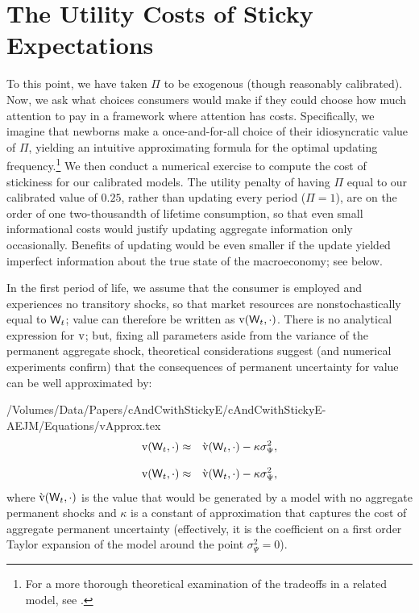 \documentclass[titlepage]{./econtex}
\begin{document}
 
\hypertarget{Utility-Costs-Of-Sticky-Expectations}{}
\section{The Utility Costs of Sticky Expectations}\label{sec:uCost}

To this point, we have taken $\Pi$ to be exogenous (though reasonably calibrated).  Now, we ask what choices consumers would make if they could choose how much attention to pay in a framework where attention has costs.  Specifically, we imagine that newborns make a once-and-for-all choice of their idiosyncratic value of $\Pi$, yielding an intuitive approximating formula for the optimal updating frequency.\footnote{For a more thorough theoretical examination of the tradeoffs in a related model, see \cite{reis:inattentive}.}  We then conduct a numerical exercise to compute the cost of stickiness for our calibrated models.  The utility penalty of having $\Pi$ equal to our calibrated value of $0.25$, rather than updating every period ($\Pi=1$), are on the order of one two-thousandth of lifetime consumption, so that even small informational costs would justify updating aggregate information only occasionally.  Benefits of updating would be even smaller if the update yielded imperfect information about the true state of the macroeconomy; see below.

In the first period of life, we assume that the consumer is employed and experiences no transitory shocks, so that market resources are nonstochastically equal to $\mathsf{W}_t$; value can therefore be written as $\mathrm{v}(\mathsf{W}_t,\cdot)$.  There is no analytical expression for $\mathrm{v}$; but, fixing all parameters aside from the variance of the permanent aggregate shock, theoretical considerations suggest (and numerical experiments confirm) that the consequences of permanent uncertainty for value can be well approximated by:
\begin{verbatimwrite}{/Volumes/Data/Papers/cAndCwithStickyE/cAndCwithStickyE-AEJM/Equations/vApprox.tex}
\begin{eqnarray*}
   \mathrm{v}(\mathsf{W}_t,\cdot) & \approx & \grave{\mathrm{v}}(\mathsf{W}_t,\cdot) - \kappa \sigma^{2}_{\Psi}, \label{eq:vApprox}
\end{eqnarray*}
\end{verbatimwrite}
\begin{eqnarray*}
   \mathrm{v}(\mathsf{W}_t,\cdot) & \approx & \grave{\mathrm{v}}(\mathsf{W}_t,\cdot) - \kappa \sigma^{2}_{\Psi}, \label{eq:vApprox}
\end{eqnarray*}
  where $\grave{\mathrm{v}}(\mathsf{W}_t,\cdot)$ is the value that would be generated by a model with no aggregate permanent shocks and $\kappa$ is a constant of approximation that captures the cost of aggregate permanent uncertainty (effectively, it is the coefficient on a first order Taylor expansion of the model around the point $\sigma_{\Psi}^{2}=0$).
\end{document}
